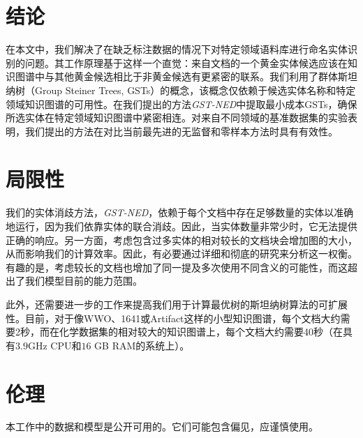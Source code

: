 \documentclass[11pt]{article}
\begin{document}
\section{结论}
在本文中，我们解决了在缺乏标注数据的情况下对特定领域语料库进行命名实体识别的问题。其工作原理基于这样一个直觉：来自文档的一个黄金实体候选应该在知识图谱中与其他黄金候选相比于非黄金候选有更紧密的联系。我们利用了群体斯坦纳树（Group Steiner Trees, GSTs）的概念，该概念仅依赖于候选实体名称和特定领域知识图谱的可用性。在我们提出的方法\emph{GST-NED}中提取最小成本GSTs，确保所选实体在特定领域知识图谱中紧密相连。对来自不同领域的基准数据集的实验表明，我们提出的方法在对比当前最先进的无监督和零样本方法时具有有效性。
\section*{局限性}
我们的实体消歧方法，\emph{GST-NED}，依赖于每个文档中存在足够数量的实体以准确地运行，因为我们依靠实体的联合消歧。因此，当实体数量非常少时，它无法提供正确的响应。另一方面，考虑包含过多实体的相对较长的文档块会增加图的大小，从而影响我们的计算效率。因此，有必要通过详细和彻底的研究来分析这一权衡。有趣的是，考虑较长的文档也增加了同一提及多次使用不同含义的可能性，而这超出了我们模型目前的能力范围。

\noindent 此外，还需要进一步的工作来提高我们用于计算最优树的斯坦纳树算法的可扩展性。目前，对于像WWO、1641或Artifact这样的小型知识图谱，每个文档大约需要2秒，而在化学数据集的相对较大的知识图谱上，每个文档大约需要40秒（在具有$3.9$GHz CPU和$16$ GB RAM的系统上）。
\section*{伦理}
本工作中的数据和模型是公开可用的。它们可能包含偏见，应谨慎使用。


\end{document}
